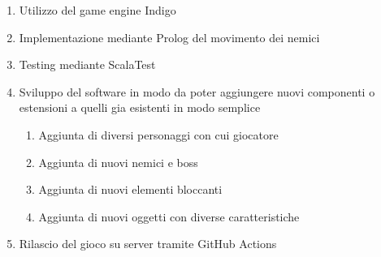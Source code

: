 \begin{enumerate}
\item Utilizzo del game engine Indigo
\item Implementazione mediante Prolog del movimento dei nemici
\item Testing mediante ScalaTest
\item Sviluppo del software in modo da poter aggiungere nuovi componenti o estensioni a quelli gia esistenti in modo semplice
\begin{enumerate}
    \item Aggiunta di diversi personaggi con cui giocatore
    \item Aggiunta di nuovi nemici e boss
    \item Aggiunta di nuovi elementi bloccanti
    \item Aggiunta di nuovi oggetti con diverse caratteristiche
\end{enumerate}
\item Rilascio del gioco su server tramite GitHub Actions
\end{enumerate}